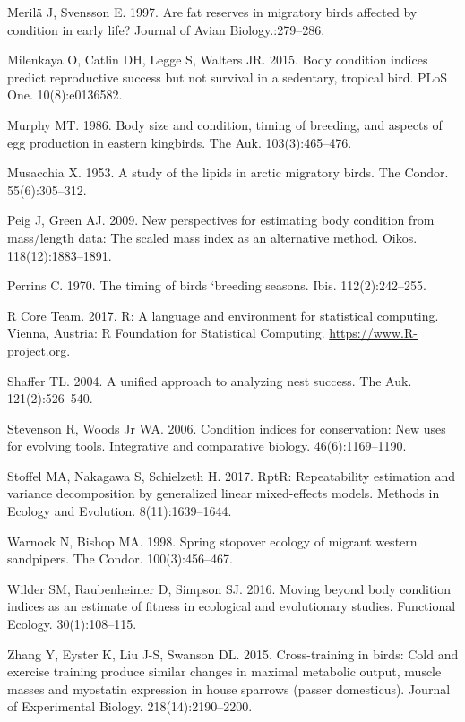 \documentclass[
]{article}
\begin{document}
\leavevmode\hypertarget{ref-merila1997fat}{}%
Merilä J, Svensson E. 1997. Are fat reserves in migratory birds affected
by condition in early life? Journal of Avian Biology.:279--286.

\leavevmode\hypertarget{ref-milenkaya2015body}{}%
Milenkaya O, Catlin DH, Legge S, Walters JR. 2015. Body condition
indices predict reproductive success but not survival in a sedentary,
tropical bird. PLoS One. 10(8):e0136582.

\leavevmode\hypertarget{ref-murphy1986body}{}%
Murphy MT. 1986. Body size and condition, timing of breeding, and
aspects of egg production in eastern kingbirds. The Auk.
103(3):465--476.

\leavevmode\hypertarget{ref-musacchia1953study}{}%
Musacchia X. 1953. A study of the lipids in arctic migratory birds. The
Condor. 55(6):305--312.

\leavevmode\hypertarget{ref-peig2009new}{}%
Peig J, Green AJ. 2009. New perspectives for estimating body condition
from mass/length data: The scaled mass index as an alternative method.
Oikos. 118(12):1883--1891.

\leavevmode\hypertarget{ref-perrins1970timing}{}%
Perrins C. 1970. The timing of birds `breeding seasons. Ibis.
112(2):242--255.

\leavevmode\hypertarget{ref-rcoreteam}{}%
R Core Team. 2017. R: A language and environment for statistical
computing. Vienna, Austria: R Foundation for Statistical Computing.
\url{https://www.R-project.org}.

\leavevmode\hypertarget{ref-shaffer2004unified}{}%
Shaffer TL. 2004. A unified approach to analyzing nest success. The Auk.
121(2):526--540.

\leavevmode\hypertarget{ref-stevenson2006condition}{}%
Stevenson R, Woods Jr WA. 2006. Condition indices for conservation: New
uses for evolving tools. Integrative and comparative biology.
46(6):1169--1190.

\leavevmode\hypertarget{ref-stoffel2017rptr}{}%
Stoffel MA, Nakagawa S, Schielzeth H. 2017. RptR: Repeatability
estimation and variance decomposition by generalized linear
mixed-effects models. Methods in Ecology and Evolution.
8(11):1639--1644.

\leavevmode\hypertarget{ref-warnock1998spring}{}%
Warnock N, Bishop MA. 1998. Spring stopover ecology of migrant western
sandpipers. The Condor. 100(3):456--467.

\leavevmode\hypertarget{ref-wilder2016moving}{}%
Wilder SM, Raubenheimer D, Simpson SJ. 2016. Moving beyond body
condition indices as an estimate of fitness in ecological and
evolutionary studies. Functional Ecology. 30(1):108--115.

\leavevmode\hypertarget{ref-zhang2015cross}{}%
Zhang Y, Eyster K, Liu J-S, Swanson DL. 2015. Cross-training in birds:
Cold and exercise training produce similar changes in maximal metabolic
output, muscle masses and myostatin expression in house sparrows (passer
domesticus). Journal of Experimental Biology. 218(14):2190--2200.
\end{document}
